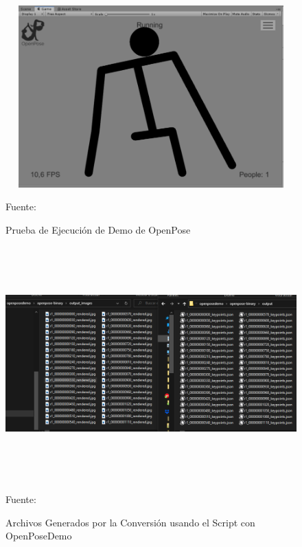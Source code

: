 \newpage
\begin{figure}[t!]
	\centering
	\includegraphics[width=14cm,height=7cm,]{./Images/ejemploopenunity.png}
	\caption{Prueba de Ejecución de Demo de OpenPose}
	\footnotesize Fuente: \cite{8765346}\cite{cao2017realtime}\cite{simon2017hand}\cite{wei2016cpm}
	\label{unitydemoexample}
\end{figure}
\begin{figure}[t!]
	\centering
	\includegraphics[width=16cm,height=9cm,]{./Images/JSONandJPGexample.png}
	\caption{Archivos Generados por la Conversión usando el Script con OpenPoseDemo}
	\footnotesize Fuente: \cite{8765346}\cite{cao2017realtime}\cite{simon2017hand}\cite{wei2016cpm}
	\label{videotojsonpjg}
\end{figure}

